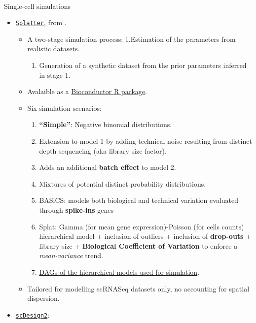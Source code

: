 \documentclass[
  letterpaper,
]{book}
\makeatletter
\let\oldparagraph\paragraph
\renewcommand{\paragraph}{
    \@ifstar
      \xxxParagraphStar
      \xxxParagraphNoStar
  }
\newcommand{\xxxParagraphStar}[1]{\oldparagraph*{#1}\mbox{}}
\newcommand{\xxxParagraphNoStar}[1]{\oldparagraph{#1}\mbox{}}
\providecommand{\tightlist}{%
  \setlength{\itemsep}{0pt}\setlength{\parskip}{0pt}}\usepackage{longtable,booktabs,array}
\makeatother
\begin{document}
\paragraph{Single-cell simulations}\label{single-cell-simulations}

\begin{itemize}
\tightlist
\item
  \href{https://genomebiology.biomedcentral.com/articles/10.1186/s13059-017-1305-0}{\texttt{Splatter}},
  from \textcite{zappia2017gb}.

  \begin{itemize}
  \tightlist
  \item
    A two-stage simulation process: 1.Estimation of the parameters from
    realistic datasets.

    \begin{enumerate}
    \def\labelenumi{\arabic{enumi}.}
    \setcounter{enumi}{1}
    \tightlist
    \item
      Generation of a synthetic dataset from the prior parameters
      inferred in stage 1.
    \end{enumerate}
  \item
    Avalaible as a
    \href{https://www.bioconductor.org/packages/release/bioc/html/splatter.html}{Bioconductor
    R package}.
  \item
    Six simulation scenarios:

    \begin{enumerate}
    \def\labelenumi{\arabic{enumi}.}
    \tightlist
    \item
      \textbf{``Simple''}: Negative binomial distributions.
    \item
      Extension to model 1 by adding technical noise resulting from
      distinct depth sequencing (aka library size factor).
    \item
      Adds an additional \textbf{batch effect} to model 2.
    \item
      Mixtures of potential distinct probability distributions.
    \item
      BASiCS: models both biological and technical variation evaluated
      through \textbf{spike-ins} genes
    \item
      Splat: Gamma (for mean gene expression)-Poisson (for cells counts)
      hierarchical model + inclusion of outliers + inclusion of
      \textbf{drop-outs} + library size + \textbf{Biological Coefficient
      of Variation} to enforce a \emph{mean-variance} trend.
    \item
      \href{https://static-content.springer.com/esm/art\%3A10.1186\%2Fs13059-017-1305-0/MediaObjects/13059_2017_1305_MOESM1_ESM.pdf}{DAGs
      of the hierarchical models used for simulation}.
    \end{enumerate}
  \item
    Tailored for modelling scRNASeq datasets only, no accounting for
    spatial dispersion.
  \end{itemize}
\item
  \href{https://github.com/JSB-UCLA/scDesign2}{\texttt{scDesign2}}:


\end{itemize}
\end{document}

